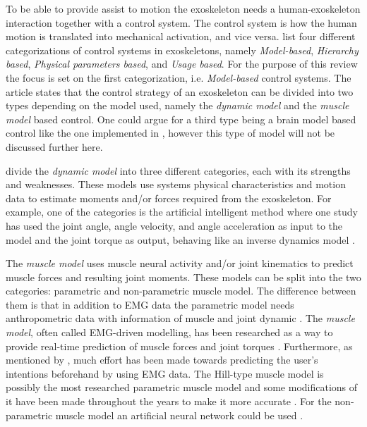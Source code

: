 To be able to provide assist to motion the exoskeleton needs a human-exoskeleton interaction together with a control system. 
The control system is how the human motion is translated into mechanical activation, and vice versa. 
 list four different categorizations of control systems in exoskeletons, namely \textit{Model-based}, \textit{Hierarchy based}, \textit{Physical parameters based}, and \textit{Usage based}. 
For the purpose of this review the focus is set on the first categorization, i.e. \textit{Model-based} control systems.
The article states that the control strategy of an exoskeleton can be divided into two types depending on the model used, namely the \textit{dynamic model} and the \textit{muscle model} based control. 
One could argue for a third type being a brain model based control like the one implemented in \cite{Wang2017a}, however this type of model will not be discussed further here.

\citeauthor{Anam2012} divide the \textit{dynamic model} into three different categories, each with its strengths and weaknesses.
These models use systems physical characteristics and motion data to estimate moments and/or forces required from the exoskeleton. 
For example, one of the categories is the artificial intelligent method where one study has used the joint angle, angle velocity, and angle acceleration as input to the model and the joint torque as output, behaving like an inverse dynamics model \cite{Anam2012}.

The \textit{muscle model} uses muscle neural activity and/or joint kinematics to predict muscle forces and resulting joint moments. These models can be split into the two categories: parametric and non-parametric muscle model. 
The difference between them is that in addition to EMG data the parametric model needs anthropometric data with information of muscle and joint dynamic \cite{Anam2012}.
The \textit{muscle model}, often called EMG-driven modelling, has been researched as a way to provide real-time prediction of muscle forces and joint torques \cite{Anam2012, durandau, Pizzolato2015}. 
Furthermore, as mentioned by , much effort has been made towards predicting the user's intentions beforehand by using EMG data.
The Hill-type muscle model is possibly the most researched parametric muscle model and some modifications of it have been made throughout the years to make it more accurate \cite{Lloyd2003, Anam2012, Pizzolato2015, Lee14-1}.
For the non-parametric muscle model an artificial neural network could be used \cite{Kiguchi2012,Lee14-1}.  

